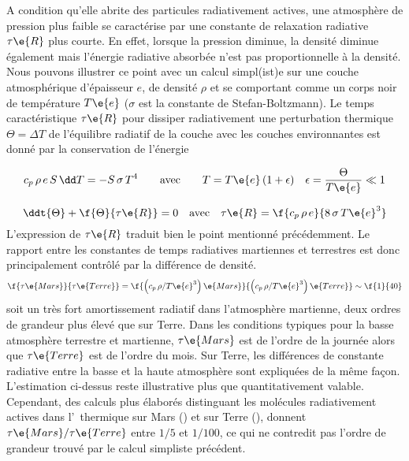 A condition qu'elle abrite
des particules radiativement actives,
une atmosphère de pression
plus faible se caractérise par une constante
de relaxation radiative $\tau\e{R}$ plus
courte.
%
En effet, lorsque la pression
diminue, la densité diminue également
mais l'énergie radiative absorbée n'est
pas proportionnelle à la densité.
%
Nous pouvons illustrer ce point avec
un calcul simpl(ist)e sur une couche
atmosphérique d'épaisseur $e$, de densité $\rho$ 
et se comportant comme un corps noir
de température $T\e{e}$
($\sigma$ est la constante de Stefan-Boltzmann).
%
Le temps caractéristique $\tau\e{R}$ pour 
dissiper radiativement une
perturbation thermique $\Theta=\Delta T$
de l'équilibre radiatif de la couche
avec les couches environnantes est
donné par la conservation de l'énergie

\[
c_p \, \rho \, e \, S \, \dd T = - S \, \sigma \, T^4 \qquad \textrm{avec} \qquad T = T\e{e} \, (1 + \epsilon) \quad \epsilon = \frac{\Theta}{T\e{e}} \ll 1
\]

\[
\ddt{\Theta} + \f{\Theta}{\tau\e{R}} = 0
\quad \textrm{avec} \quad
\tau\e{R} = \f{c_p \, \rho \, e}{8 \, \sigma \, T\e{e}^3}
\]
%
\noindent L'expression de $\tau\e{R}$ traduit
bien le point mentionné précédemment.
%
Le rapport entre les constantes
de temps radiatives martiennes et terrestres
est donc principalement contrôlé
par la différence de densité.
\[
\f{ \tau\e{Mars} }{ \tau\e{Terre} }
=
\f{ \left( c_p \, \rho / T\e{e}^3 \right)\e{Mars} }{ \left( c_p \, \rho / T\e{e}^3 \right)\e{Terre} }
\sim 
\f{1}{40}
\]
%
\noindent soit un très fort amortissement
radiatif dans l'atmosphère martienne, deux ordres
de grandeur plus élevé que sur Terre.
%
Dans les conditions typiques pour la basse
atmosphère terrestre et martienne, 
$\tau\e{Mars}$ est de l'ordre de la journée
alors que $\tau\e{Terre}$ est de l'ordre du mois.
%
Sur Terre, les différences de constante radiative
entre la basse et la haute atmosphère sont expliquées
de la même façon.
%
L'estimation ci-dessus reste illustrative plus que quantitativement
valable.
%
Cependant, des calculs plus élaborés 
distinguant les molécules radiativement actives 
dans l'\IR~thermique sur Mars (\carb) et sur Terre (\eau),
donnent $\tau\e{Mars}/\tau\e{Terre}$
entre $1/5$ et $1/100$, ce qui
ne contredit pas l'ordre de grandeur
trouvé par le calcul simpliste
précédent. 
%
%






